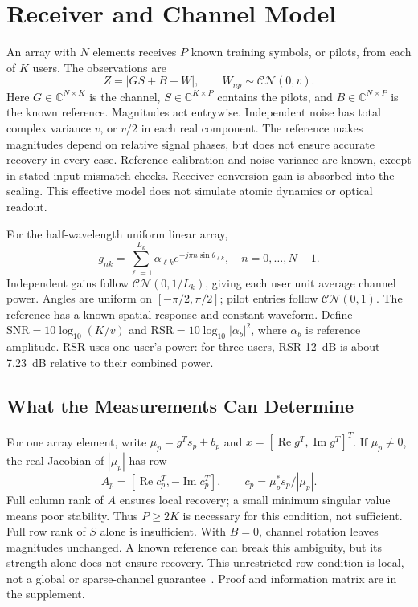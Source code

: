 \documentclass[journal]{IEEEtran}
\newcommand{\CN}{\mathcal{CN}}
\begin{document}
\section{Receiver and Channel Model}
An array with $N$ elements receives $P$ known training symbols, or pilots,
from each of $K$ users. The observations are
\begin{equation}
 Z=|GS+B+W|,\qquad W_{np}\sim\CN(0,v).
 \label{eq:model}
\end{equation}
Here $G\in\mathbb C^{N\times K}$ is the channel,
$S\in\mathbb C^{K\times P}$ contains the pilots, and
$B\in\mathbb C^{N\times P}$ is the known reference. Magnitudes act
entrywise. Independent noise has total complex variance $v$, or $v/2$ in
each real component. The reference makes magnitudes depend on relative
signal phases, but does not ensure accurate recovery in every case.
Reference calibration and noise variance are known, except in stated
input-mismatch checks. Receiver conversion gain is absorbed into the scaling.
This effective model does not simulate atomic dynamics or optical readout.

For the half-wavelength uniform linear array,
\begin{equation}
 g_{nk}=\sum_{\ell=1}^{L_k}\alpha_{\ell k}e^{-j\pi n\sin\theta_{\ell k}},
 \quad n=0,\ldots,N-1.
\end{equation}
Independent gains follow $\CN(0,1/L_k)$, giving each user unit average
channel power. Angles are uniform on $[-\pi/2,\pi/2]$; pilot entries
follow $\CN(0,1)$. The reference has a known spatial response and constant waveform. Define
$\mathrm{SNR}=10\log_{10}(K/v)$ and
$\mathrm{RSR}=10\log_{10}|\alpha_b|^2$, where $\alpha_b$ is reference
amplitude. RSR uses one user's power: for three users, RSR 12~dB is
about 7.23~dB relative to their combined power.

\subsection{What the Measurements Can Determine}
For one array element, write $\mu_p=g^Ts_p+b_p$ and
$x=[\operatorname{Re}g^T,\operatorname{Im}g^T]^T$. If $\mu_p\ne0$, the
real Jacobian of $|\mu_p|$ has row
\begin{equation}
 A_p=\left[\operatorname{Re}c_p^T,-\operatorname{Im}c_p^T\right],
 \qquad c_p=\mu_p^*s_p/|\mu_p|.
\end{equation}
Full column rank of $A$ ensures local recovery; a small minimum singular
value means poor stability. Thus $P\ge2K$ is necessary for this condition,
not sufficient. Full row rank of $S$ alone is insufficient. With $B=0$,
channel rotation leaves magnitudes unchanged. A known reference can break
this ambiguity, but its strength alone does not ensure recovery. This
unrestricted-row condition is local, not a global or sparse-channel
guarantee~\cite{gao2018}. Proof and information matrix are in the supplement.
\end{document}
